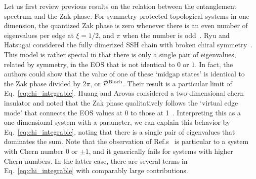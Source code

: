 \documentclass[twocolumn,amsmath,longbibliography,amssymb,superscriptaddress]{revtex4-1}
\begin{document}
Let us first review previous results on the relation between the entanglement spectrum and the Zak phase. 
For symmetry-protected topological systems in one dimension, the quantized Zak phase is zero whenever there is an even number  of eigenvalues per edge at $\xi = 1/2$, and $\pi$ when the number is odd~\cite{Peschel2008}. 
Ryu and Hatsugai considered the fully dimerized SSH chain with broken chiral symmetry~\cite{Ryu2006}.  
This model is rather special in that there is only a single pair of eigenvalues, related by symmetry, in the EOS that is not identical to $0$ or $1$. 
In fact, the authors could show that the value of one of these `midgap states' is identical to the Zak phase divided by $2\pi$, or $\tilde{\mathcal{P}}^{\rm Bloch}$. 
Their result is a particular limit of Eq.~\eqref{eq:chi_integrable}. 
%
Huang and Arovas considered a two-dimensional chern insulator and noted that the Zak phase qualitatively follows the `virtual edge mode' that connects the EOS values at 0 to those at 1~\cite{Huang2012,Huang2012-2}. 
Interpreting this as a one-dimensional system with a parameter, we can explain this behavior by Eq.~\eqref{eq:chi_integrable}, noting that there is a single pair of eigenvalues that dominates the sum. 
Note that the observation of Ref.s~\cite{Huang2012,Huang2012-2} is particular to a system with Chern number 0 or $\pm 1$, and it generically fails for systems with higher Chern numbers. 
In the latter case, there are several terms in Eq.~\eqref{eq:chi_integrable} with comparably large contributions. 
\end{document}
